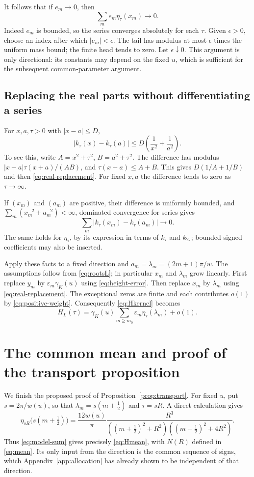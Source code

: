 \documentclass[11pt,a4paper]{article}
\theoremstyle{definition}
\theoremstyle{remark}
\numberwithin{equation}{section}
\begin{document}
It follows that if $e_m\to0$, then
\begin{equation}\label{eq:height-error}
 \sum_m e_m\eta_\tau(x_m)\longrightarrow0 .
\end{equation}
Indeed $e_m$ is bounded, so the series converges absolutely for each
$\tau$. Given $\epsilon>0$, choose an index after which $|e_m|<\epsilon$.
The tail has modulus at most $\epsilon$ times the uniform mass bound;
the finite head tends to zero. Let $\epsilon\downarrow0$.
This argument is only directional: its constants may depend on the
fixed $u$, which is sufficient for the subsequent common-parameter argument.

\subsection{Replacing the real parts without differentiating a series}
For $x,a,\tau>0$ with $|x-a|\le D$,
\begin{equation}\label{eq:real-replacement}
 |k_\tau(x)-k_\tau(a)|
 \le D\left(\frac1{x^2}+\frac1{a^2}\right).
\end{equation}
To see this, write $A=x^2+\tau^2$, $B=a^2+\tau^2$. The difference
has modulus
$|x-a|\tau(x+a)/(AB)$, and $\tau(x+a)\le A+B$.
This gives $D(1/A+1/B)$ and then \eqref{eq:real-replacement}.
For fixed $x,a$ the difference tends to zero as $\tau\to\infty$.

If $(x_m)$ and $(a_m)$ are positive, their difference is uniformly
bounded, and $\sum_m(x_m^{-2}+a_m^{-2})<\infty$, dominated convergence
for series gives
\[
 \sum_m|k_\tau(x_m)-k_\tau(a_m)|\longrightarrow0.
\]
The same holds for $\eta_\tau$, by its expression in terms of
$k_\tau$ and $k_{2\tau}$; bounded signed coefficients may also be
inserted.

Apply these facts to a fixed direction and
$a_m=\lambda_m=(2m+1)\pi/w$. The assumptions follow from
\eqref{eq:rootsL}; in particular $x_m$ and $\lambda_m$ grow linearly.
First replace $y_m$ by $\varepsilon_m\gamma_K(u)$ using
\eqref{eq:height-error}. Then replace $x_m$ by $\lambda_m$ using
\eqref{eq:real-replacement}. The exceptional zeros are finite and
each contributes $o(1)$ by \eqref{eq:positive-weight}.
Consequently \eqref{eq:Hkernel} becomes
\begin{equation}\label{eq:model-sum}
 H_L(\tau)=\gamma_K(u)\sum_{m\ge m_0}
                         \varepsilon_m\eta_\tau(\lambda_m)+o(1).
\end{equation}

\section{The common mean and proof of the transport proposition}\label{app:mean}
We finish the proposed proof of Proposition~\ref{prop:transport}.
For fixed $u$, put $s=2\pi/w(u)$, so that
$\lambda_m=s(m+\tfrac12)$ and $\tau=sR$. A direct calculation gives
\[
 \eta_{sR}\bigl(s(m+\tfrac12)\bigr)
 =\frac{12w(u)}{\pi}
   \frac{R^3}{((m+\tfrac12)^2+R^2)((m+\tfrac12)^2+4R^2)} .
\]
Thus \eqref{eq:model-sum} gives precisely \eqref{eq:Hmean}, with
$N(R)$ defined in \eqref{eq:mean}. Its only input from the direction
is the common sequence of signs, which Appendix~\ref{app:allocation}
has already shown to be independent of that direction.
\end{document}
